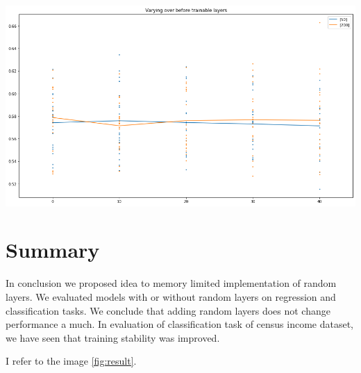\documentclass[]{article}
\newenvironment{Figure}
{\par\medskip\noindent\minipage{\linewidth}}
{\endminipage\par\medskip}
\begin{document}
\begin{multicols}{2}
	\begin{Figure}
		\centering
		\includegraphics[width=\linewidth]{index.png}
		\label{fig:result}
	\end{Figure}
	
	\section{Summary}
	In conclusion we proposed idea to memory limited implementation of random layers. We evaluated models with or without random layers on regression and classification tasks. We conclude that adding random layers does not change performance a much. In evaluation of classification task of census income dataset, we have seen that training stability was improved.
	
	
	
\end{multicols}

I refer to the image \ref{fig:result}.
\end{document}
